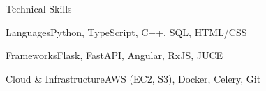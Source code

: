 \documentclass[
	11pt
]{../../../template}
\begin{document}
	\begin{rSection}{T}{echnical Skills}
		\begin{rSet}{Languages}{Python, TypeScript, C++, SQL, HTML/CSS}
		\end{rSet}
		\begin{rSet}{Frameworks}{Flask, FastAPI, Angular, RxJS, JUCE}
		\end{rSet}
		\begin{rSet}{Cloud \& Infrastructure}{AWS (EC2, S3), Docker, Celery, Git}
		\end{rSet}
	\end{rSection}
\end{document}
